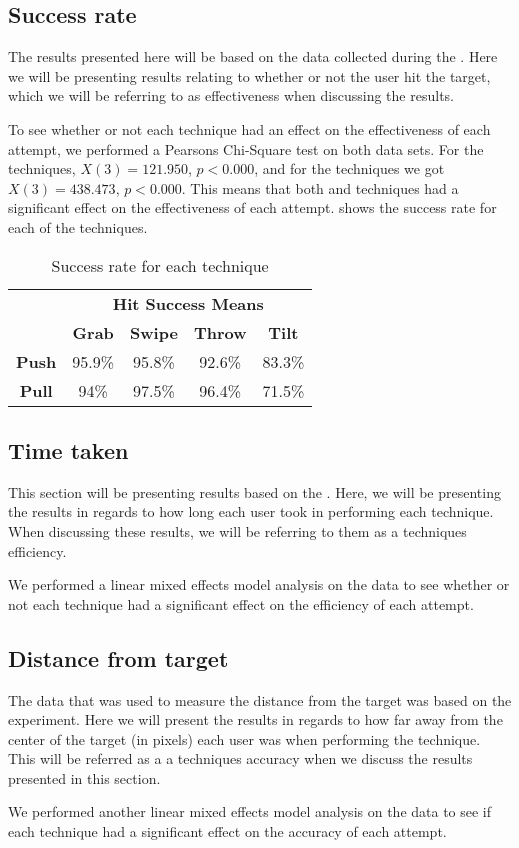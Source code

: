 \subsection{Success rate}
The results presented here will be based on the data collected during the \target. 
Here we will be presenting results relating to whether or not the user hit the target, which we will be referring to as effectiveness when discussing the results. 

To see whether or not each technique had an effect on the effectiveness of each attempt, we performed a Pearsons Chi-Square test on both data sets. 
For the \push techniques, $X(3)=121.950$, $p<0.000$, and for the \pull techniques we got $X(3)=438.473$, $p<0.000$. 
This means that both \push and \pull techniques had a significant effect on the effectiveness of each attempt. 
 shows the success rate for each of the techniques. 

\begin{table}[H]
	\centering
		\begin{tabular}{c c c c c}
			\cline{2-5}
			& \multicolumn{4}{c}{\textbf{Hit Success Means}} \\
			\cline{2-5}
			& \textbf{Grab} & \textbf{Swipe} & \textbf{Throw} & \textbf{Tilt} \\ \hline
			\textbf{Push} & 95.9\% & 95.8\% & 92.6\% & 83.3\% \\ \hline
			\textbf{Pull} & 94\% & 97.5\% & 96.4\% & 71.5\% \\ \hline
		\end{tabular}
	\caption{Success rate for each technique}
	\label{tab:successRate}
\end{table}

\subsection{Time taken}
This section will be presenting results based on the \target.
Here, we will be presenting the results in regards to how long each user took in performing each technique. 
When discussing these results, we will be referring to them as a techniques efficiency.

We performed a linear mixed effects model analysis on the data to see whether or not each technique had a significant effect on the efficiency of each attempt. 

\subsection{Distance from target}
The data that was used to measure the distance from the target was based on the \accuracy experiment.
Here we will present the results in regards to how far away from the center of the target (in pixels) each user was when performing the technique. 
This will be referred as a a techniques accuracy when we discuss the results presented in this section. 

We performed another linear mixed effects model analysis on the data to see if each technique had a significant effect on the accuracy of each attempt. 


